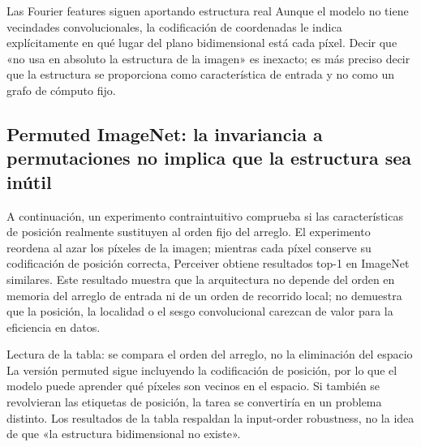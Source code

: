 
\begin{warningbox}{Las Fourier features siguen aportando estructura real}
Aunque el modelo no tiene vecindades convolucionales, la codificación de coordenadas le indica explícitamente en qué lugar del plano bidimensional está cada píxel. Decir que «no usa en absoluto la estructura de la imagen» es inexacto; es más preciso decir que la estructura se proporciona como característica de entrada y no como un grafo de cómputo fijo.
\end{warningbox}

\subsection{Permuted ImageNet: la invariancia a permutaciones no implica que la estructura sea inútil}

A continuación, un experimento contraintuitivo comprueba si las características de posición realmente sustituyen al orden fijo del arreglo. El experimento reordena al azar los píxeles de la imagen; mientras cada píxel conserve su codificación de posición correcta, Perceiver obtiene resultados top-1 en ImageNet similares. Este resultado muestra que la arquitectura no depende del orden en memoria del arreglo de entrada ni de un orden de recorrido local; no demuestra que la posición, la localidad o el sesgo convolucional carezcan de valor para la eficiencia en datos.


\begin{knowledgebox}{Lectura de la tabla: se compara el orden del arreglo, no la eliminación del espacio}
La versión permuted sigue incluyendo la codificación de posición, por lo que el modelo puede aprender qué píxeles son vecinos en el espacio. Si también se revolvieran las etiquetas de posición, la tarea se convertiría en un problema distinto. Los resultados de la tabla respaldan la input-order robustness, no la idea de que «la estructura bidimensional no existe».
\end{knowledgebox}

